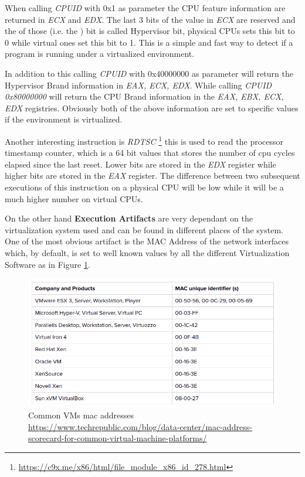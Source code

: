 When calling \textit{CPUID} with 0x1 as parameter the CPU feature information are returned in \textit{ECX} and \textit{EDX}. The last 3 bits of the value in \textit{ECX} are reserved and the  of those (i.e. the ) bit is called Hypervisor bit, physical CPUs sets this bit to 0 while virtual ones set this bit to 1. This is a simple and fast way to detect if a program is running under a virtualized environment. 

In addition to this calling \textit{CPUID} with 0x40000000 as parameter will return the Hypervisor Brand information in \textit{EAX, ECX, EDX}. While calling \textit{CPUID 0x80000000} will return the CPU Brand information in the \textit{EAX, EBX, ECX, EDX} registries. Obviously both of the above information are set to specific values if the environment is virtualized. 

Another interesting instruction is \textit{RDTSC} \footnote{\url{https://c9x.me/x86/html/file_module_x86_id_278.html}} this is used to read the processor timestamp counter, which is a 64 bit values that stores the number of cpu cycles elapsed since the last reset. Lower bits are stored in the \textit{EDX} register while higher bits are stored in the \textit{EAX} register. The difference between two subsequent executions of this instruction on a physical CPU will be low while it will be a much higher number on virtual CPUs.

On the other hand \textbf{Execution Artifacts} are very dependant on the virtualization system used and can be found in different places of the system. One of the most obvious artifact is the MAC Address of the network interfaces which, by default, is set to well known values by all the different Virtualization Software as in Figure \ref{fig:vms}.

\noindent
\begin{figure}[htp]
\centering
\includegraphics[width=\linewidth]{images/vms-mac-address.png}
\caption{Common VMs mac addresses \newline \url{https://www.techrepublic.com/blog/data-center/mac-address-scorecard-for-common-virtual-machine-platforms/}}
\label{fig:vms}
\end{figure}

